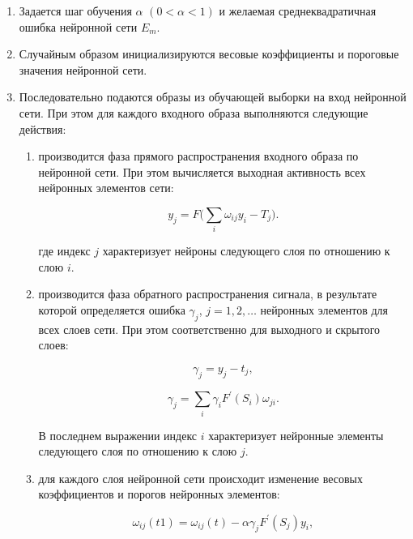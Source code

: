 \begin{enumerate}[wide, labelindent=10mm]
    \item Задается шаг обучения $\alpha$ $(0 < \alpha < 1)$ и желаемая среднеквадратичная ошибка нейронной сети $E_m$.

    \item Случайным образом инициализируются весовые коэффициенты и пороговые значения нейронной сети.

    \item Последовательно подаются образы из обучающей выборки на вход нейронной сети. При этом для каждого входного образа выполняются следующие действия:

    \begin{enumerate}[wide, labelindent=20mm]
        \item производится фаза прямого распространения входного образа по нейронной сети. При этом вычисляется выходная активность всех нейронных элементов сети:

        \begin{equation}
            y_j = F(\sum_{i}{\omega_{i j}y_i - T_j)}.
        \end{equation}

        где индекс $j$ характеризует нейроны следующего слоя по отношению к слою $i$.

        \item производится фаза обратного распространения сигнала, в результате которой определяется ошибка $\gamma_j$, $j = 1, 2, \ldots$ нейронных элементов для всех слоев сети. При этом соответственно для выходного и скрытого слоев:

        \begin{equation}
            \gamma_j = y_j - t_j,
        \end{equation}

        \begin{equation}
            \gamma_j = \sum_{i}{\gamma_iF^\prime(S_i)\omega_{j i}}.
        \end{equation}

        В последнем выражении индекс $i$ характеризует нейронные элементы следующего слоя по отношению к слою $j$.

        \item для каждого слоя нейронной сети происходит изменение весовых коэффициентов и порогов нейронных элементов:

        \begin{equation}
            \omega_{i j}(t  1) = \omega_{i j}(t) - \alpha\gamma_jF^\prime(S_j)y_i,
        \end{equation}


\end{enumerate}
\end{enumerate}
